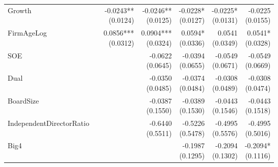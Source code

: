 \begin{table}[htbp]
{\begin{tabular}{lrrrrrr}
Growth &  & \shortstack{-0.0243** \\ (0.0124)} & \shortstack{-0.0246** \\ (0.0125)} & \shortstack{-0.0228* \\ (0.0127)} & \shortstack{-0.0225* \\ (0.0131)} & \shortstack{-0.0225 \\ (0.0155)}\\[8pt]
FirmAgeLog &  & \shortstack{0.0856*** \\ (0.0312)} & \shortstack{0.0904*** \\ (0.0324)} & \shortstack{0.0594* \\ (0.0336)} & \shortstack{0.0541 \\ (0.0349)} & \shortstack{0.0541* \\ (0.0328)}\\[8pt]
SOE &  &  & \shortstack{-0.0622 \\ (0.0645)} & \shortstack{-0.0394 \\ (0.0655)} & \shortstack{-0.0549 \\ (0.0671)} & \shortstack{-0.0549 \\ (0.0669)}\\[8pt]
Dual &  &  & \shortstack{-0.0350 \\ (0.0485)} & \shortstack{-0.0374 \\ (0.0484)} & \shortstack{-0.0308 \\ (0.0489)} & \shortstack{-0.0308 \\ (0.0474)}\\[8pt]
BoardSize &  &  & \shortstack{-0.0387 \\ (0.1550)} & \shortstack{-0.0389 \\ (0.1530)} & \shortstack{-0.0443 \\ (0.1546)} & \shortstack{-0.0443 \\ (0.1518)}\\[8pt]
IndependentDirectorRatio &  &  & \shortstack{-0.6440 \\ (0.5511)} & \shortstack{-0.5226 \\ (0.5478)} & \shortstack{-0.4995 \\ (0.5576)} & \shortstack{-0.4995 \\ (0.5016)}\\[8pt]
Big4 &  &  &  & \shortstack{-0.1987 \\ (0.1295)} & \shortstack{-0.2094 \\ (0.1302)} & \shortstack{-0.2094* \\ (0.1116)}\\[8pt]

\end{tabular}}
\end{table}
